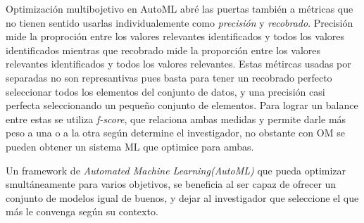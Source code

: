 Optimizaci\'on multibojetivo en AutoML abr\'e las puertas tambi\'en a m\'etricas que no tienen sentido usarlas individualemente como \textit{precisi\'on} y \textit{recobrado}.
 Precisi\'on mide la proproci\'on entre los valores relevantes identificados y todos los valores identificados mientras que recobrado mide la proporci\'on entre los valores relevantes identificados y todos los valores relevantes. Estas m\'etircas usadas por separadas no son represantivas pues basta para tener un recobrado perfecto seleccionar todos los elementos del conjunto de datos, y una precisi\'on casi perfecta seleccionando un pequeño conjunto de elementos. Para lograr un balance entre estas se utiliza \textit{f-score}, que relaciona ambas medidas y permite darle m\'as peso a una o a la otra seg\'un determine el investigador, no obstante con OM se pueden obtener un sistema ML que optimice para ambas.



Un framework de \textit{Automated Machine Learning(AutoML)} que pueda optimizar smult\'aneamente para varios objetivos, se beneficia al ser capaz de ofrecer un conjunto de modelos igual de buenos, y dejar al investigador que seleccione el que m\'as le convenga seg\'un su contexto.




